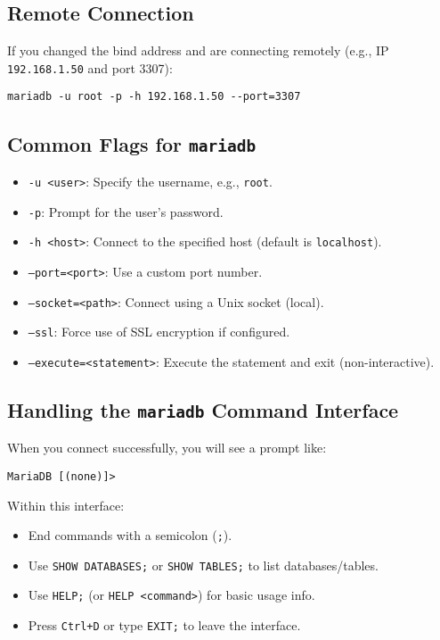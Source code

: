 \documentclass[10pt]{article}
\begin{document}
\subsection{Remote Connection}
If you changed the bind address and are connecting remotely (e.g., IP \texttt{192.168.1.50} and port 3307):
\begin{lstlisting}
mariadb -u root -p -h 192.168.1.50 --port=3307
\end{lstlisting}

\subsection{Common Flags for \texttt{mariadb}}
\begin{itemize}
    \item \texttt{-u <user>}: Specify the username, e.g., \texttt{root}.
    \item \texttt{-p}: Prompt for the user’s password.
    \item \texttt{-h <host>}: Connect to the specified host (default is \texttt{localhost}).
    \item \texttt{--port=<port>}: Use a custom port number.
    \item \texttt{--socket=<path>}: Connect using a Unix socket (local).
    \item \texttt{--ssl}: Force use of SSL encryption if configured.
    \item \texttt{--execute=<statement>}: Execute the statement and exit (non-interactive).
\end{itemize}

\subsection{Handling the \texttt{mariadb} Command Interface}
When you connect successfully, you will see a prompt like:
\begin{lstlisting}
MariaDB [(none)]>
\end{lstlisting}
Within this interface:
\begin{itemize}
    \item End commands with a semicolon (\texttt{;}).
    \item Use \texttt{SHOW DATABASES;} or \texttt{SHOW TABLES;} to list databases/tables.
    \item Use \texttt{HELP;} (or \texttt{HELP <command>}) for basic usage info.
    \item Press \texttt{Ctrl+D} or type \texttt{EXIT;} to leave the interface.
\end{itemize}
\end{document}
